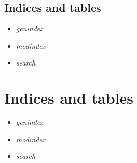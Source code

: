 \documentclass[letterpaper,10pt,english]{sphinxmanual}
\begin{document}
\section{Indices and tables}
\label{reference:indices-and-tables}\begin{itemize}
\item {} 
\emph{genindex}

\item {} 
\emph{modindex}

\item {} 
\emph{search}

\end{itemize}


\chapter{Indices and tables}
\label{index:indices-and-tables}\begin{itemize}
\item {} 
\emph{genindex}

\item {} 
\emph{modindex}

\item {} 
\emph{search}

\end{itemize}
\end{document}

